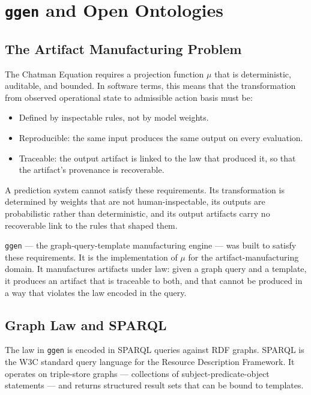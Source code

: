 \chapter{\texttt{ggen} and Open Ontologies}
\label{chap:ggen}

\section{The Artifact Manufacturing Problem}

The Chatman Equation requires a projection function $\mu$ that is deterministic, auditable, and bounded. In software terms, this means that the transformation from observed operational state to admissible action basis must be:

\begin{itemize}
  \item Defined by inspectable rules, not by model weights.
  \item Reproducible: the same input produces the same output on every evaluation.
  \item Traceable: the output artifact is linked to the law that produced it, so that the artifact's provenance is recoverable.
\end{itemize}

A prediction system cannot satisfy these requirements. Its transformation is determined by weights that are not human-inspectable, its outputs are probabilistic rather than deterministic, and its output artifacts carry no recoverable link to the rules that shaped them.

\texttt{ggen} --- the graph-query-template manufacturing engine --- was built to satisfy these requirements. It is the implementation of $\mu$ for the artifact-manufacturing domain. It manufactures artifacts under law: given a graph query and a template, it produces an artifact that is traceable to both, and that cannot be produced in a way that violates the law encoded in the query.

\section{Graph Law and SPARQL}

The law in \texttt{ggen} is encoded in SPARQL queries against RDF graphs. SPARQL is the W3C standard query language for the Resource Description Framework. It operates on triple-store graphs --- collections of subject-predicate-object statements --- and returns structured result sets that can be bound to templates.

